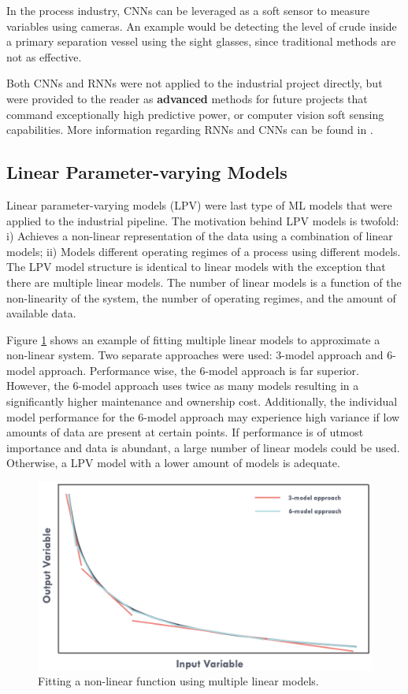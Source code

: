 In the process industry, CNNs can be leveraged as a soft sensor to measure variables using cameras. An example would be detecting the level of crude inside a primary separation vessel using the sight glasses, since traditional methods are not as effective.

Both CNNs and RNNs were not applied to the industrial project directly, but were provided to the reader as \textbf{advanced} methods for future projects that command exceptionally high predictive power, or computer vision soft sensing capabilities.  More information regarding RNNs and CNNs can be found in \cite{NN}.

\subsection{Linear Parameter-varying Models}
Linear parameter-varying models (LPV) were last type of ML models that were applied to the industrial pipeline. The motivation behind LPV models is twofold: i) Achieves a non-linear representation of the data using a combination of linear models; ii) Models different operating regimes of a process using different models.  The LPV model structure is identical to linear models with the exception that there are multiple linear models.  The number of linear models is a function of the non-linearity of the system, the number of operating regimes, and the amount of available data.  

Figure \ref{fig:02LPVexample} shows an example of fitting multiple linear models to approximate a non-linear system. Two separate approaches were used: 3-model approach and 6-model approach.  Performance wise, the 6-model approach is far superior. However, the 6-model approach uses twice as many models resulting in a significantly higher maintenance and ownership cost.  Additionally, the individual model performance for the 6-model approach may experience high variance if low amounts of data are present at certain points.  If performance is of utmost importance and data is abundant, a large number of linear models could be used.  Otherwise, a LPV model with a lower amount of models is adequate.

\begin{figure}[h]
    \centering
    \includegraphics[width=\textwidth]{images/ch2/02LPVexample.jpeg}
    \caption{Fitting a non-linear function using multiple linear models.}
    \label{fig:02LPVexample}
\end{figure}

